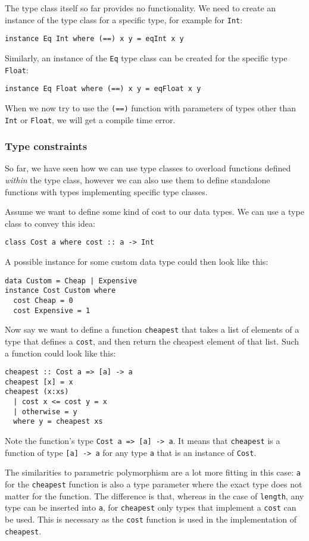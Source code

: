 The type class itself so far provides no functionality. We need to create an instance of the type class for a specific type, for example for \verb|Int|:
\begin{verbatim}
instance Eq Int where (==) x y = eqInt x y
\end{verbatim}
Similarly, an instance of the \verb|Eq| type class can be created for the specific type \verb|Float|:
\begin{verbatim}
instance Eq Float where (==) x y = eqFloat x y
\end{verbatim}
When we now try to use the \verb|(==)| function with parameters of types other than \verb|Int| or \verb|Float|, we will get a compile time error.

\subsubsection{Type constraints}\label{constraints}

So far, we have seen how we can use type classes to overload functions defined \emph{within} the type class, however we can also use them to define standalone functions with types implementing specific type classes.

Assume we want to define some kind of cost to our data types. We can use a type class to convey this idea:
\begin{verbatim}
class Cost a where cost :: a -> Int
\end{verbatim}
A possible instance for some custom data type could then look like this:
\begin{verbatim}
data Custom = Cheap | Expensive
instance Cost Custom where
  cost Cheap = 0
  cost Expensive = 1
\end{verbatim}
Now say we want to define a function \verb|cheapest| that takes a list of elements of a type that defines a \verb|cost|, and then return the cheapest element of that list. Such a function could look like this:
\begin{verbatim}
cheapest :: Cost a => [a] -> a
cheapest [x] = x
cheapest (x:xs)
  | cost x <= cost y = x
  | otherwise = y
  where y = cheapest xs
\end{verbatim}
Note the function's type \verb|Cost a => [a] -> a|. It means that \verb|cheapest| is a function of type \verb|[a] -> a| for any type \verb|a| that is an instance of \verb|Cost|.

The similarities to parametric polymorphism are a lot more fitting in this case: \verb|a| for the \verb|cheapest| function is also a type parameter where the exact type does not matter for the function. The difference is that, whereas in the case of \verb|length|, any type can be inserted into \verb|a|, for \verb|cheapest| only types that implement a \verb|cost| can be used. This is necessary as the \verb|cost| function is used in the implementation of \verb|cheapest|.

